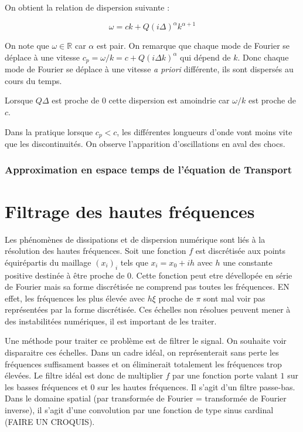 \documentclass[10pt,a4paper]{amsart}
\begin{document}
On obtient la relation de dispersion suivante :

\begin{equation}
\omega = ck + Q \left( i \Delta \right)^{\alpha} k^{\alpha +1}
\end{equation}

On note que $\omega \in \mathbb{R}$ car $\alpha$ est pair. On remarque que chaque mode de Fourier se déplace à une vitesse $c_p = \omega / k = c + Q \left( i \Delta k \right)^{\alpha}$ qui dépend de $k$. Donc chaque mode de Fourier se déplace à une vitesse \textit{a priori} différente, ils sont dispersés au cours du temps.

Lorsque $Q \Delta$ est proche de $0$ cette dispersion est amoindrie car $\omega / k$ est proche de $c$.

Dans la pratique lorsque $c_p < c$, les différentes longueurs d'onde vont moins vite que les discontinuités. On observe l'apparition d'oscillations en aval des chocs.

\section{Approximation en espace temps de l'équation de Transport}


%
%

\part{Filtrage des hautes fréquences}

Les phénomènes de dissipations et de dispersion numérique sont liés à la résolution des hautes fréquences. Soit une fonction $f$ est discrétisée aux points équirépartis du maillage $(x_i)_i$ tels que $x_i = x_0+ih$ avec $h$ une constante positive destinée à être proche de $0$. Cette fonction peut etre dévellopée en série de Fourier mais sa forme discrétisée ne comprend pas toutes les fréquences. EN effet, les fréquences les plus élevée avec $h \xi$ proche de $\pi$ sont mal voir pas représentées par la forme discrétisée. Ces échelles non résolues peuvent mener à des instabilitées numériques, il est important de les traiter.

Une méthode pour traiter ce problème est de filtrer le signal. On souhaite voir disparaitre ces échelles. Dans un cadre idéal, on représenterait sans perte les fréquences suffisament basses et on éliminerait totalement les fréquences trop élevées. Le filtre idéal est donc de multiplier $\widehat{f}$ par une fonction porte valant $1$ sur les basses fréquences et $0$ sur les hautes fréquences. Il s'agit d'un filtre passe-bas. Dans le domaine spatial (par transformée de Fourier = transformée de Fourier inverse), il s'agit d'une convolution par une fonction de type sinus cardinal (FAIRE UN CROQUIS).
\end{document}
